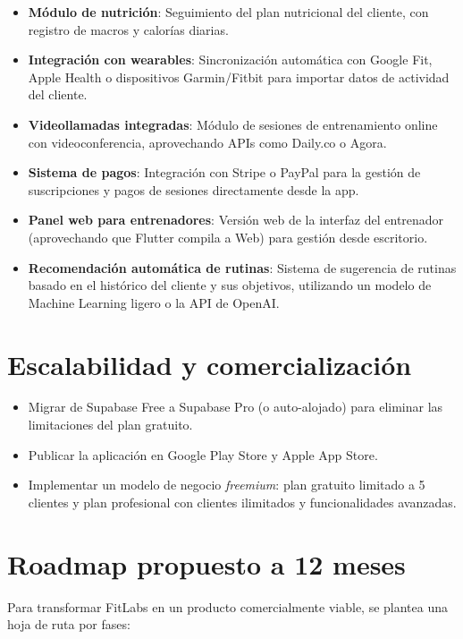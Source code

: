 \begin{itemize}
  \item \textbf{Módulo de nutrición}: Seguimiento del plan nutricional del cliente, con registro de macros y calorías diarias.
  \item \textbf{Integración con wearables}: Sincronización automática con Google Fit, Apple Health o dispositivos Garmin/Fitbit para importar datos de actividad del cliente.
  \item \textbf{Videollamadas integradas}: Módulo de sesiones de entrenamiento online con videoconferencia, aprovechando APIs como Daily.co o Agora.
  \item \textbf{Sistema de pagos}: Integración con Stripe o PayPal para la gestión de suscripciones y pagos de sesiones directamente desde la app.
  \item \textbf{Panel web para entrenadores}: Versión web de la interfaz del entrenador (aprovechando que Flutter compila a Web) para gestión desde escritorio.
  \item \textbf{Recomendación automática de rutinas}: Sistema de sugerencia de rutinas basado en el histórico del cliente y sus objetivos, utilizando un modelo de Machine Learning ligero o la API de OpenAI.
\end{itemize}

\section{Escalabilidad y comercialización}

\begin{itemize}
  \item Migrar de Supabase Free a Supabase Pro (o auto-alojado) para eliminar las limitaciones del plan gratuito.
  \item Publicar la aplicación en Google Play Store y Apple App Store.
  \item Implementar un modelo de negocio \textit{freemium}: plan gratuito limitado a 5 clientes y plan profesional con clientes ilimitados y funcionalidades avanzadas.
\end{itemize}

\section{Roadmap propuesto a 12 meses}

Para transformar FitLabs en un producto comercialmente viable, se plantea una hoja de ruta por fases:

